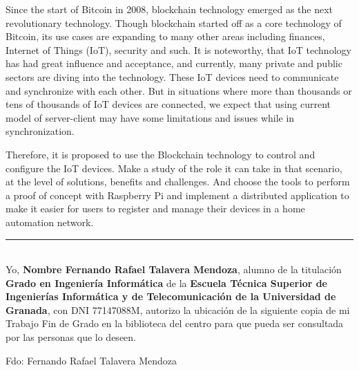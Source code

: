 
\vspace{0.7cm}

\vspace{5mm}

Since the start of Bitcoin in 2008, blockchain technology emerged as the next revolutionary technology. 
Though blockchain started off as a core technology of Bitcoin, its use cases are expanding to many other 
areas including finances, Internet of Things (IoT), security and such. It is noteworthy, that IoT technology 
has had great influence and acceptance, and currently, many private and public sectors are diving into the 
technology. These IoT devices need to communicate and synchronize with each other. But in situations where 
more than thousands or tens of thousands of IoT devices are connected, we expect that using current model of 
server-client may have some limitations and issues while in synchronization.

\vspace{5mm}

\noindent Therefore, it is proposed to use the Blockchain technology to control and configure the IoT devices. 
Make a study of the role it can take in that scenario, at the level of solutions, benefits and challenges. 
And choose the tools to perform a proof of concept with Raspberry Pi and implement a distributed application 
to make it easier for users to register and manage their devices in a home automation network.

\clearpage
\thispagestyle{empty}

\noindent\rule[-1ex]{\textwidth}{2pt}\\[4.5ex]

Yo, \textbf{Nombre Fernando Rafael Talavera Mendoza}, alumno de la titulación \textbf{Grado en Ingeniería Informática} 
de la \textbf{Escuela Técnica Superior de Ingenierías Informática y de Telecomunicación de la Universidad de Granada}, 
con DNI 77147088M, autorizo la ubicación de la siguiente copia de mi Trabajo Fin de Grado en la biblioteca del centro 
para que pueda ser consultada por las personas que lo deseen.

\vspace{6cm}

\noindent Fdo: Fernando Rafael Talavera Mendoza

\vspace{2cm}

